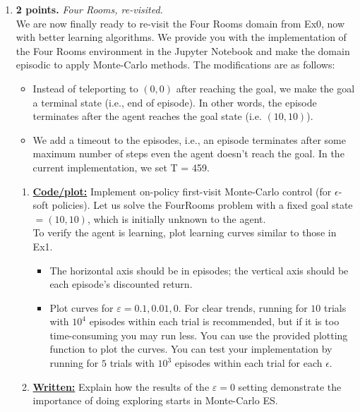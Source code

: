\documentclass{article}
\begin{document}
\begin{enumerate}
	\item \textbf{2 points.} \textit{Four Rooms, re-visited.} \\
	      We are now finally ready to re-visit the Four Rooms domain from Ex0, now with better learning algorithms. We provide you with the implementation of the Four Rooms environment in the Jupyter Notebook and make the domain episodic to apply Monte-Carlo methods. The modifications are as follows:
	      \begin{itemize}
	          \item Instead of teleporting to $(0,0)$ after reaching the goal, we make the goal a terminal state (i.e., end of episode). In other words, the episode terminates after the agent reaches the goal state (i.e. $(10, 10)$).
	          \item We add a timeout to the episodes, i.e., an episode terminates after some maximum number of steps even the agent doesn't reach the goal. In the current implementation, we set T = 459. 
	      \end{itemize} 
	      \begin{enumerate}
		      
		      \item \uline{\textbf{Code/plot:}} Implement on-policy first-visit Monte-Carlo control (for $\epsilon$-soft policies). Let us solve the FourRooms problem with a fixed goal state $= (10,10)$, which is initially unknown to the agent. \\
		            To verify the agent is learning, plot learning curves similar to those in Ex1.
		            \begin{itemize}
			            \item The horizontal axis should be in episodes; the vertical axis should be each episode's discounted return.
			            \item Plot curves for $\varepsilon = 0.1, 0.01, 0$. For clear trends, running for $10$ trials with $10^4$ episodes within each trial is recommended, but if it is too time-consuming you may run less. You can use the provided plotting function to plot the curves. You can test your implementation by running for $5$ trials with $10^3$ episodes within each trial for each $\epsilon$.
		            \end{itemize}
		      \item \uline{\textbf{Written:}} Explain how the results of the $\varepsilon = 0$ setting demonstrate the importance of doing exploring starts in Monte-Carlo ES.
	      \end{enumerate}


\end{enumerate}
\end{document}
